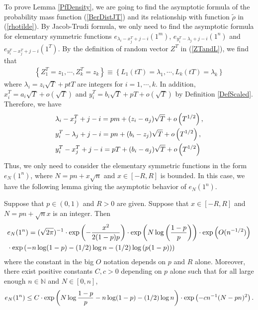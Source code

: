 To prove Lemma \ref{PfDensity}, we are going to find the asymptotic formula of the probability mass function (\ref{BerDistJT}) and its relationship with function $\widetilde{\rho}$ in (\ref{rhotilde}). By Jacob-Trudi formula, we only need to find the asymptotic formula for elementary symmetric functions $e_{\lambda_{i}-x_{j}^{T}+j-i}(1^{m})$, $e_{y_{i}^{T}-\lambda_{j}+j-i}(1^{n})$ and $e_{y_{i}^{T}-x_{j}^{T}+j-i}(1^{T})$. By the definition of random vector $Z^{T}$ in (\ref{ZTandL}), we find that 
\begin{align}
	\left\{Z^{T}_{1}=z_1,\cdots, Z^{T}_{k}=z_k\right\}\equiv\left\{L_{1}(tT)=\lambda_1,\cdots,L_{k}(tT)=\lambda_k\right\}
\end{align}
where $\lambda_{i}=z_{i}\sqrt{T}+ptT$ are integers for $i=1,\cdots,k$. In addition, $x_{i}^{T}= a_{i}\sqrt{T}+o\left(\sqrt{T}\right)$ and $y_{i}^{T}= b_{i}\sqrt{T}+pT+o\left(\sqrt{T}\right)$ by Definition \ref{DefScaled}. Therefore, we have
\begin{equation}{\label{3N}}
\begin{split}
	&\lambda_{i}-x_{j}^{T}+j-i=pm+(z_i-a_j)\sqrt{T}+o\left(T^{1/2}\right),\\ 
	& y_{i}^{T}-\lambda_{j}+j-i=pn+(b_{i}-z_{j})\sqrt{T}+o\left(T^{1/2}\right),\\
	& y_{i}^{T}-x_{j}^{T}+j-i=pT+(b_i-a_j)\sqrt{T}+o\left(T^{1/2}\right)
\end{split}
\end{equation}
Thus, we only need to consider the elementary symmetric functions in the form $e_{N}(1^{n})$, where $N=pn+x\sqrt{n}$ and $x\in[-R,R]$ is bounded. In this case, we have the following lemma giving the asymptotic behavior of $e_{N}(1^{n})$.
\begin{lemma}{\label{Limh}}
	Suppose that $p\in(0,1)$ and $R>0$ are given. Suppose that $x\in[-R,R]$ and $N=pn+\sqrt{n}x$ is an integer. Then 
\begin{equation}
	\begin{split}{\label{AsympForh}}
&e_{N}(1^{n})=(\sqrt{2\pi})^{-1}\cdot \exp\left(-\frac{x^2}{2(1-p)p}\right)\cdot \exp\left(N\log\left(\frac{1-p}{p}\right)\right)\cdot \exp\left(O(n^{-1/2})\right)\\
& \cdot\exp\left(-n\log(1-p)-(1/2)\log n-(1/2)\log\left(p(1-p)\right)\right)
\end{split}
\end{equation}
where the constant in the big $O$ notation depends on $p$ and $R$ alone. Moreover, there exist positive constants $C,c>0$ depending on $p$ alone such that for all large enough $n\in\mathbb{N}$ and $N\in[0,n]$,
\begin{equation}{\label{ebounded}}
	e_{N}(1^n)\leq C\cdot \exp\left(N\log\frac{1-p}{p}-n\log(1-p)-(1/2)\log n\right)\cdot \exp\left(-cn^{-1}(N-pn)^2\right).
\end{equation}
\end{lemma}
